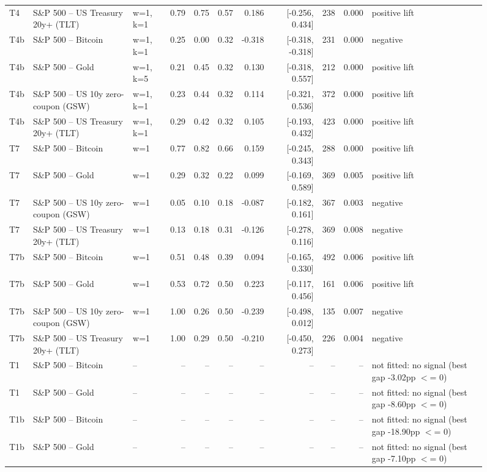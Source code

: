 \begin{figure}
\begin{tabular}{lllrrrrrrrl}
T4 & S\&P 500 -- US Treasury 20y+ (TLT) & w=1, k=1 & 0.79 & 0.75 & 0.57 & 0.186 & [-0.256, 0.434] & 238 & 0.000 & positive lift \\
T4b & S\&P 500 -- Bitcoin & w=1, k=1 & 0.25 & 0.00 & 0.32 & -0.318 & [-0.318, -0.318] & 231 & 0.000 & negative \\
T4b & S\&P 500 -- Gold & w=1, k=5 & 0.21 & 0.45 & 0.32 & 0.130 & [-0.318, 0.557] & 212 & 0.000 & positive lift \\
T4b & S\&P 500 -- US 10y zero-coupon (GSW) & w=1, k=1 & 0.23 & 0.44 & 0.32 & 0.114 & [-0.321, 0.536] & 372 & 0.000 & positive lift \\
T4b & S\&P 500 -- US Treasury 20y+ (TLT) & w=1, k=1 & 0.29 & 0.42 & 0.32 & 0.105 & [-0.193, 0.432] & 423 & 0.000 & positive lift \\
T7 & S\&P 500 -- Bitcoin & w=1 & 0.77 & 0.82 & 0.66 & 0.159 & [-0.245, 0.343] & 288 & 0.000 & positive lift \\
T7 & S\&P 500 -- Gold & w=1 & 0.29 & 0.32 & 0.22 & 0.099 & [-0.169, 0.589] & 369 & 0.005 & positive lift \\
T7 & S\&P 500 -- US 10y zero-coupon (GSW) & w=1 & 0.05 & 0.10 & 0.18 & -0.087 & [-0.182, 0.161] & 367 & 0.003 & negative \\
T7 & S\&P 500 -- US Treasury 20y+ (TLT) & w=1 & 0.13 & 0.18 & 0.31 & -0.126 & [-0.278, 0.116] & 369 & 0.008 & negative \\
T7b & S\&P 500 -- Bitcoin & w=1 & 0.51 & 0.48 & 0.39 & 0.094 & [-0.165, 0.330] & 492 & 0.006 & positive lift \\
T7b & S\&P 500 -- Gold & w=1 & 0.53 & 0.72 & 0.50 & 0.223 & [-0.117, 0.456] & 161 & 0.006 & positive lift \\
T7b & S\&P 500 -- US 10y zero-coupon (GSW) & w=1 & 1.00 & 0.26 & 0.50 & -0.239 & [-0.498, 0.012] & 135 & 0.007 & negative \\
T7b & S\&P 500 -- US Treasury 20y+ (TLT) & w=1 & 1.00 & 0.29 & 0.50 & -0.210 & [-0.450, 0.273] & 226 & 0.004 & negative \\
T1 & S\&P 500 -- Bitcoin & -- & -- & -- & -- & -- & -- & -- & -- & not fitted: no signal (best gap -3.02pp $<$= 0) \\
T1 & S\&P 500 -- Gold & -- & -- & -- & -- & -- & -- & -- & -- & not fitted: no signal (best gap -8.60pp $<$= 0) \\
T1b & S\&P 500 -- Bitcoin & -- & -- & -- & -- & -- & -- & -- & -- & not fitted: no signal (best gap -18.90pp $<$= 0) \\
T1b & S\&P 500 -- Gold & -- & -- & -- & -- & -- & -- & -- & -- & not fitted: no signal (best gap -7.10pp $<$= 0) \\

\end{tabular}
\end{figure}

